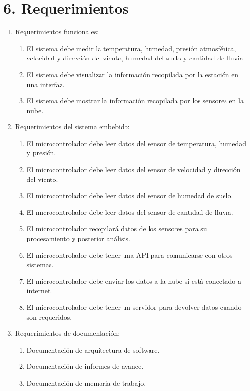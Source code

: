 \documentclass[
11pt, %
codirector, %
]{charter}
\begin{document}
\section{6. Requerimientos}
\label{sec:requerimientos}

\begin{enumerate}
	\item Requerimientos funcionales:
		\begin{enumerate}
			\item El sistema debe medir la temperatura, humedad, presión atmosférica, velocidad y dirección del viento, humedad del suelo y cantidad de lluvia.
			\item El sistema debe visualizar la información recopilada por la estación en una interfaz.
			\item El sistema debe mostrar la información recopilada por los sensores en la nube. 
		\end{enumerate}
	\item Requerimientos del sistema embebido:
		\begin{enumerate}
			\item El microcontrolador debe leer datos del sensor de temperatura, humedad y presión.
			\item El microcontrolador debe leer datos del sensor de velocidad y dirección del viento.
			\item El microcontrolador debe leer datos del sensor de humedad de suelo.
			\item El microcontrolador debe leer datos del sensor de cantidad de lluvia.			
			\item El microcontrolador recopilará datos de los sensores para su procesamiento y posterior análisis.
			\item El microcontrolador debe tener una API para comunicarse con otros sistemas.
			\item El microcontrolador debe enviar los datos a la nube si está conectado a internet.
			\item El microcontrolador debe tener un servidor para devolver datos cuando son requeridos.
		\end{enumerate}
	\newpage
	\item Requerimientos de documentación:
		\begin{enumerate}
			\item Documentación de arquitectura de software.
			\item Documentación de informes de avance.
			\item Documentación de memoria de trabajo.

\end{enumerate}
\end{enumerate}
\end{document}
